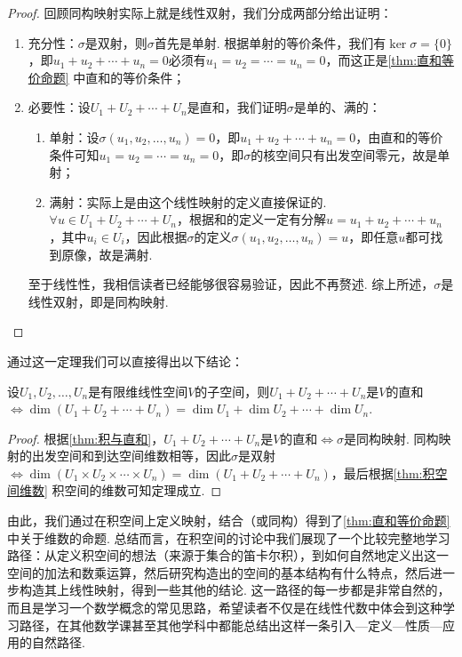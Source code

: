 \begin{proof}
    回顾同构映射实际上就是线性双射，我们分成两部分给出证明：
    \begin{enumerate}
        \item 充分性：$\sigma$是双射，则$\sigma$首先是单射. 根据单射的等价条件，我们有$\ker \sigma=\{0\}$，即$u_1+u_2+\cdots+u_n=0$必须有$u_1=u_2=\cdots=u_n=0$，而这正是\autoref{thm:直和等价命题} 中直和的等价条件；

        \item 必要性：设$U_1+U_2+\cdots+U_n$是直和，我们证明$\sigma$是单的、满的：
              \begin{enumerate}
                  \item 单射：设$\sigma(u_1,u_2,\ldots,u_n)=0$，即$u_1+u_2+\cdots+u_n=0$，由直和的等价条件可知$u_1=u_2=\cdots=u_n=0$，即$\sigma$的核空间只有出发空间零元，故是单射；

                  \item 满射：实际上是由这个线性映射的定义直接保证的. $\forall u \in U_1+U_2+\cdots+U_n$，根据和的定义一定有分解$u=u_1+u_2+\cdots+u_n$，其中$u_i \in U_i$，因此根据$\sigma$的定义$\sigma(u_1,u_2,\ldots,u_n)=u$，即任意$u$都可找到原像，故是满射.
              \end{enumerate}
              至于线性性，我相信读者已经能够很容易验证，因此不再赘述. 综上所述，$\sigma$是线性双射，即是同构映射.
    \end{enumerate}
\end{proof}

通过这一定理我们可以直接得出以下结论：
\begin{theorem}{}{}
    设$U_1,U_2,\ldots,U_n$是有限维线性空间$V$的子空间，则$U_1+U_2+\cdots+U_n$是$V$的直和$\iff \dim(U_1+U_2+\cdots+U_n)=\dim U_1+\dim U_2+\cdots+\dim U_n$.
\end{theorem}

\begin{proof}
    根据\autoref{thm:积与直和}，$U_1+U_2+\cdots+U_n$是$V$的直和$\iff \sigma$是同构映射. 同构映射的出发空间和到达空间维数相等，因此$\sigma$是双射$\iff \dim(U_1 \times U_2 \times \cdots \times U_n)=\dim(U_1+U_2+\cdots+U_n)$，最后根据\autoref{thm:积空间维数} 积空间的维数可知定理成立.
\end{proof}

由此，我们通过在积空间上定义映射，结合（或同构）得到了\autoref{thm:直和等价命题} 中关于维数的命题. 总结而言，在积空间的讨论中我们展现了一个比较完整地学习路径：从定义积空间的想法（来源于集合的笛卡尔积），到如何自然地定义出这一空间的加法和数乘运算，然后研究构造出的空间的基本结构有什么特点，然后进一步构造其上线性映射，得到一些其他的结论. 这一路径的每一步都是非常自然的，而且是学习一个数学概念的常见思路，希望读者不仅是在线性代数中体会到这种学习路径，在其他数学课甚至其他学科中都能总结出这样一条引入—定义—性质—应用的自然路径.

